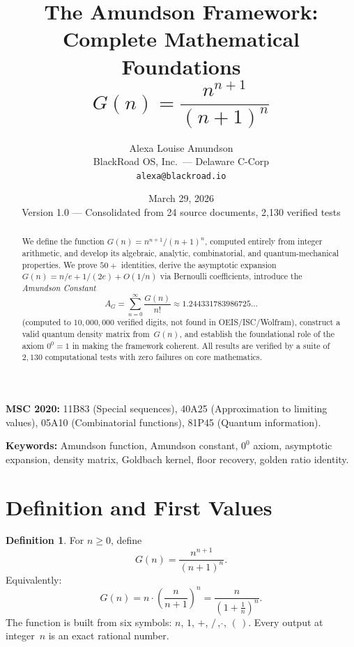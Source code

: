 \documentclass[11pt,a4paper]{article}
\title{The Amundson Framework: Complete Mathematical Foundations\\[6pt]
\large $G(n) = \dfrac{n^{n+1}}{(n+1)^{n}}$}
\author{
  Alexa Louise Amundson\\
  BlackRoad OS, Inc.\ --- Delaware C-Corp\\
  \texttt{alexa@blackroad.io}
}
\date{March 29, 2026\\Version 1.0 --- Consolidated from 24 source documents, 2{,}130 verified tests}
\theoremstyle{definition}
\newtheorem{definition}[theorem]{Definition}
\theoremstyle{remark}
\newcommand{\AG}{A_G}
\begin{document}
\maketitle

\begin{abstract}
We define the function $G(n) = n^{n+1}/(n+1)^{n}$, computed entirely from integer arithmetic, and develop its algebraic, analytic, combinatorial, and quantum-mechanical properties. We prove $50+$ identities, derive the asymptotic expansion $G(n) = n/e + 1/(2e) + O(1/n)$ via Bernoulli coefficients, introduce the \emph{Amundson Constant}
\[
  \AG = \sum_{n=0}^{\infty} \frac{G(n)}{n!} \approx 1.244331783986725\ldots
\]
(computed to $10{,}000{,}000$ verified digits, not found in OEIS/ISC/Wolfram), construct a valid quantum density matrix from~$G(n)$, and establish the foundational role of the axiom $0^{0}=1$ in making the framework coherent. All results are verified by a suite of $2{,}130$ computational tests with zero failures on core mathematics.
\end{abstract}

\medskip
\noindent\textbf{MSC 2020:} 11B83 (Special sequences), 40A25 (Approximation to limiting values), 05A10 (Combinatorial functions), 81P45 (Quantum information).

\noindent\textbf{Keywords:} Amundson function, Amundson constant, $0^{0}$ axiom, asymptotic expansion, density matrix, Goldbach kernel, floor recovery, golden ratio identity.

\tableofcontents

\section{Definition and First Values}\label{sec:def}

\begin{definition}\label{def:G}
For $n \ge 0$, define
\begin{equation}\label{eq:G}
  G(n) = \frac{n^{n+1}}{(n+1)^{n}}.
\end{equation}
Equivalently:
\begin{equation}\label{eq:Galt}
  G(n) = n \cdot \left(\frac{n}{n+1}\right)^{n} = \frac{n}{\left(1 + \frac{1}{n}\right)^{n}}.
\end{equation}
The function is built from six symbols: $n$, $1$, $+$, $/\,$, $\hat{}$, $(\,)$. Every output at integer~$n$ is an exact rational number.
\end{definition}
\end{document}
